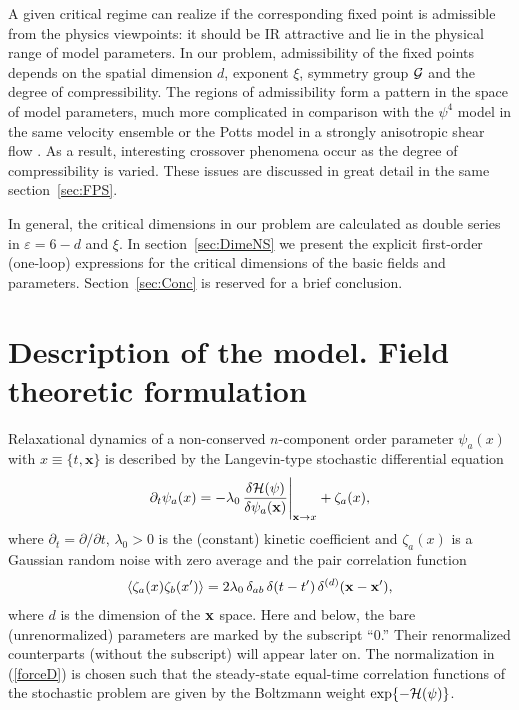\documentclass[12pt]{iopart}
\begin{document}
A given critical regime can realize if the corresponding fixed point is
admissible from the physics viewpoints: it should be IR attractive and lie
in the physical range of model parameters. In our problem, admissibility
of the fixed points depends on the spatial dimension $d$, exponent $\xi$,
symmetry group ${\cal G}$ and the degree of compressibility. The regions of
admissibility form a pattern in the space of model parameters, much more
complicated in comparison with the $\psi^{4}$ model in the same velocity
ensemble \cite{AK} or the Potts model in a strongly anisotropic shear flow
\cite{Anipoz}. As a result, interesting crossover phenomena occur as the
degree of compressibility is varied. These issues are discussed in great
detail in the same section~\ref{sec:FPS}.

In general, the critical dimensions in our problem are calculated as double
series in $\varepsilon=6-d$ and $\xi$. In section~\ref{sec:DimeNS} we present
the explicit first-order (one-loop) expressions for the critical dimensions
of the basic fields and parameters. Section~\ref{sec:Conc}  is reserved for
a brief conclusion.



\section{Description of the model. Field theoretic formulation}
\label{sec:QFT}


Relaxational dynamics of a non-conserved $n$-component order parameter
$\psi_a(x)$ with $x\equiv\{t,\textbf{x}\}$ is described by the
Langevin-type stochastic differential equation
\begin{eqnarray}
\partial_{t} \psi_a(x) =-\lambda_0 \, \frac{\delta {\cal H}(\psi)}{
\delta \psi_a({\bf x})} \Bigg{|}_{{\bf x} \to x} + \zeta_a(x),
\label{eq1}
\end{eqnarray}
where $\partial_{t} = \partial/ \partial {t}$, $\lambda_0>0$ is the
(constant) kinetic coefficient  and $\zeta_a(x)$ is a Gaussian random noise
with zero average and the pair correlation function
\begin{eqnarray}
\langle \zeta_a(x)\zeta_b(x') \rangle = 2\lambda_0\,\delta_{ab} \,
\delta(t-t')\, \delta^{(d)}(\bf x-\bf x') ,
\label{forceD}
\end{eqnarray}
where $d$ is the dimension of the $\bf x$ space. Here and below, the bare
(unrenormalized) parameters are marked by the subscript ``0.'' Their
renormalized counterparts (without the subscript) will appear later on.
The normalization in (\ref{forceD})  is chosen such that the steady-state
equal-time correlation functions of the stochastic problem are given by the
Boltzmann weight $\exp\{-{\cal H}(\psi)\}$.
\end{document}
